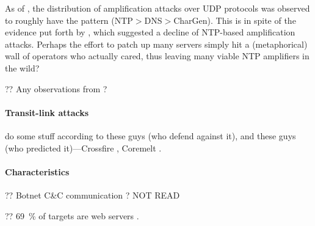 As of \citeyear{DBLP:conf/imc/JonkerKKRSD17}, the distribution of amplification attacks over UDP protocols was observed to roughly have the pattern (NTP$>$DNS$>$CharGen).
This is in spite of the evidence put forth by \textcite{DBLP:conf/imc/CzyzKGPBK14}, which suggested a decline of NTP-based amplification attacks.
Perhaps the effort to patch up many servers simply hit a (metaphorical) wall of operators who actually cared, thus leaving many viable NTP amplifiers in the wild?

?? Any observations from \textcite{DBLP:conf/raid/KramerKMNKYR15}?

\paragraph{Transit-link attacks}
do some stuff according to these guys \cite{DBLP:conf/sp/SmithS18} (who defend against it), and these guys (who predicted it)---Crossfire \cite{DBLP:conf/sp/KangLG13}, Coremelt \cite{DBLP:conf/esorics/StuderP09}.

\paragraph{Characteristics}

?? Botnet C\&C communication \cite{DBLP:conf/sac/ZandVYK14}? NOT READ

?? \SI{69}{\percent} of targets are web servers \cite{DBLP:conf/imc/JonkerKKRSD17}.

